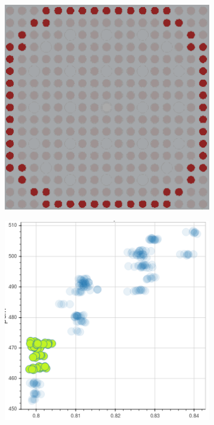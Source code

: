 \begin{figure}[h!]
\begin{subfigure}{0.45\textwidth}
  \caption{}
  \label{fig:chap10-capt-mean-pcm-mgxs}
\end{subfigure}
\begin{subfigure}{0.45\textwidth}
  \centering
  \includegraphics[width=0.9\linewidth]{figures/unsupervised/features/assm-16/u238-capt/mean-pcm/geometry-2}
  \caption{}
  \label{fig:chap10-capt-mean-pcm-geom-2}
\end{subfigure}%
\begin{subfigure}{0.45\textwidth}
  \centering
  \includegraphics[width=0.9\linewidth]{figures/unsupervised/features/assm-16/u238-capt/mean-pcm/mgxs-2}

\end{subfigure}
\end{figure}
